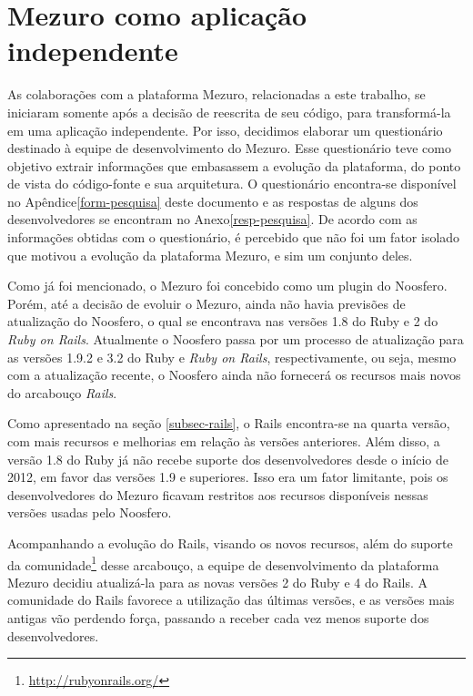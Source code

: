\section{Mezuro como aplicação independente}

As colaborações com a plataforma Mezuro, relacionadas a este trabalho, se iniciaram somente após a decisão de reescrita de seu código, para transformá-la em uma aplicação independente. Por isso, decidimos elaborar um questionário destinado à equipe de desenvolvimento do Mezuro. Esse questionário teve como objetivo extrair informações que embasassem a evolução da plataforma, do ponto de vista do código-fonte e sua arquitetura. O questionário encontra-se disponível no Apêndice\ref{form-pesquisa} deste documento e as respostas de alguns dos desenvolvedores se encontram no Anexo\ref{resp-pesquisa}.
%
De acordo com as informações obtidas com o questionário, é percebido que não foi um fator isolado que motivou a evolução da plataforma Mezuro, e sim um conjunto deles. 

Como já foi mencionado, o Mezuro foi concebido como um plugin do Noosfero. Porém, até a decisão de evoluir o Mezuro, ainda não havia previsões de atualização do Noosfero, o qual se encontrava nas versões 1.8 do Ruby e 2 do \textit{Ruby on Rails}. Atualmente o Noosfero passa por um processo de atualização para as versões 1.9.2 e 3.2 do Ruby e \textit{Ruby on Rails}, respectivamente, ou seja, mesmo com a atualização recente, o Noosfero ainda não fornecerá os recursos mais novos do arcabouço \textit{Rails}.

Como apresentado na seção \ref{subsec-rails}, o Rails encontra-se na quarta versão, com mais recursos e melhorias em relação às versões anteriores. Além disso, a versão 1.8 do Ruby já não recebe suporte dos desenvolvedores desde o início de 2012, em favor das versões 1.9 e superiores. Isso era um fator limitante, pois os desenvolvedores do Mezuro ficavam restritos aos recursos disponíveis nessas versões usadas pelo Noosfero.

Acompanhando a evolução do Rails, visando os novos recursos, além do suporte da comunidade\footnote{\url{http://rubyonrails.org/}} desse arcabouço, a equipe de desenvolvimento da plataforma Mezuro decidiu atualizá-la para as novas versões 2 do Ruby e 4 do Rails. A comunidade do Rails favorece a utilização das últimas versões, e as versões mais antigas vão perdendo força, passando a receber cada vez menos suporte dos desenvolvedores.

